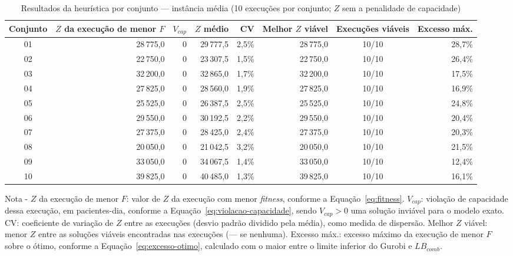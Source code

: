 \begin{table}[htbp]
    \caption{Resultados da heurística por conjunto --- instância média (10 execuções por conjunto; $Z$ sem a penalidade de capacidade)}
    \label{tab:res-z-medio}
    \centering
    \begin{adjustbox}{max width=\textwidth}
    \begin{tabular}{crrrrrcr}
        \hline
        \textbf{Conjunto} & \textbf{$Z$ da execução de menor $F$} & \textbf{$V_{cap}$} & \textbf{$Z$ médio} & \textbf{CV} & \textbf{Melhor $Z$ viável} & \textbf{Execuções viáveis} & \textbf{Excesso máx.} \\
        \hline
        01 & 28\,775,0 & 0 & 29\,777,5 & 2,5\% & 28\,775,0 & 10/10 & 28,7\% \\
        02 & 22\,750,0 & 0 & 23\,307,5 & 1,5\% & 22\,750,0 & 10/10 & 26,4\% \\
        03 & 32\,200,0 & 0 & 32\,865,0 & 1,7\% & 32\,200,0 & 10/10 & 17,5\% \\
        04 & 27\,825,0 & 0 & 28\,560,0 & 1,9\% & 27\,825,0 & 10/10 & 16,9\% \\
        05 & 25\,525,0 & 0 & 26\,387,5 & 2,5\% & 25\,525,0 & 10/10 & 24,8\% \\
        06 & 29\,550,0 & 0 & 30\,192,5 & 2,2\% & 29\,550,0 & 10/10 & 20,4\% \\
        07 & 27\,375,0 & 0 & 28\,425,0 & 2,4\% & 27\,375,0 & 10/10 & 20,3\% \\
        08 & 20\,050,0 & 0 & 21\,042,5 & 3,2\% & 20\,050,0 & 10/10 & 21,5\% \\
        09 & 33\,050,0 & 0 & 34\,067,5 & 1,4\% & 33\,050,0 & 10/10 & 12,4\% \\
        10 & 39\,825,0 & 0 & 40\,485,0 & 1,3\% & 39\,825,0 & 10/10 & 16,1\% \\
        \hline
    \end{tabular}
    \end{adjustbox}
    \par\smallskip
    {\footnotesize Nota - $Z$ da execução de menor $F$: valor de $Z$ da execução com menor \textit{fitness}, conforme a Equação~\eqref{eq:fitness}. $V_{cap}$: violação de capacidade dessa execução, em pacientes-dia, conforme a Equação~\eqref{eq:violacao-capacidade}, sendo $V_{cap} > 0$ uma solução inviável para o modelo exato. CV: coeficiente de variação de $Z$ entre as execuções (desvio padrão dividido pela média), como medida de dispersão. Melhor $Z$ viável: menor $Z$ entre as soluções viáveis encontradas nas execuções (--- se nenhuma). Excesso máx.: excesso máximo da execução de menor $F$ sobre o ótimo, conforme a Equação~\eqref{eq:excesso-otimo}, calculado com o maior entre o limite inferior do Gurobi e $LB_{comb}$.}
\end{table}
